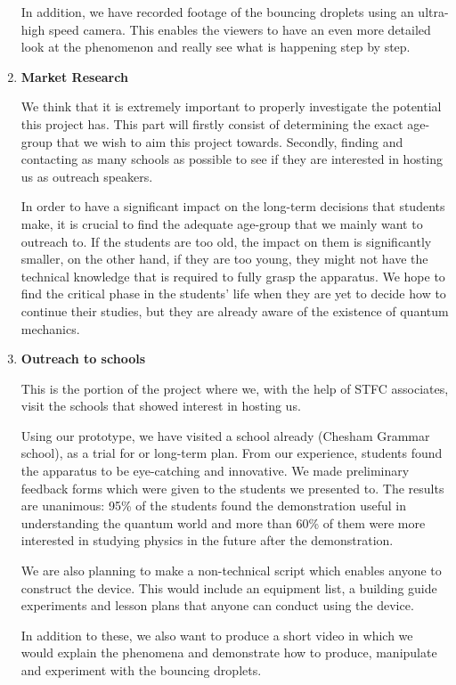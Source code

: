 \begin{enumerate}
In addition, we have recorded footage of the bouncing droplets using an ultra-high speed camera. This enables the viewers to have an even more detailed look at the phenomenon and really see what is happening step by step.


\item \textbf{Market Research}

We think that it is extremely important to properly investigate the potential this project has. This part will firstly consist of determining the exact age-group that we wish to aim this project towards. Secondly, finding and contacting as many schools as possible to see if they are interested in hosting us as outreach speakers.

In order to have a significant impact on the long-term decisions that students make, it is crucial to find the adequate age-group that we mainly want to outreach to. If the students are too old, the impact on them is significantly smaller, on the other hand, if they are too young, they might not have the technical knowledge that is required to fully grasp the apparatus. We hope to find the critical phase in the students' life when they are yet to decide how to continue their studies, but they are already aware of the existence of quantum mechanics.


\item \textbf{Outreach to schools}

This is the portion of the project where we, with the help of STFC associates, visit the schools that showed interest in hosting us. 

Using our prototype, we have visited a school already (Chesham Grammar school), as a trial for or long-term plan. From our experience, students found the apparatus to be eye-catching and innovative. We made preliminary feedback forms which were given to the students we presented to. The results are unanimous: 95\% of the students found the demonstration useful in understanding the quantum world and more than 60\% of them were more interested in studying physics in the future after the demonstration. 

We are also planning to make a non-technical script which enables anyone to construct the device. This would include an equipment list, a building guide experiments and lesson plans that anyone can conduct using the device.

In addition to these, we also want to produce a short video in which we would explain the phenomena and demonstrate how to produce, manipulate and experiment with the bouncing droplets. \ 

\end{enumerate}

